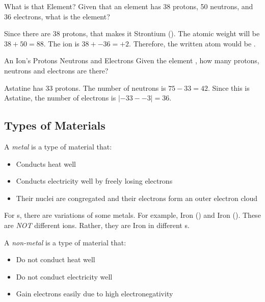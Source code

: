 \begin{example}[]{What is that Element?}
  Given that an element has 38 protons, 50 neutrons, and 36 electrons, what is the element?
  
  \tcblower
  
  Since there are 38 protons, that makes it Strontium ().
  The atomic weight will be $38 + 50 = 88$.
  The ion is $38 + -36 = +2$.
  Therefore, the written atom would be .
\end{example}

\begin{example}[]{An Ion's Protons Neutrons and Electrons}
  Given the element , how many protons, neutrons and electrons are there?
  
  \tcblower
  
  Astatine has 33 protons.
  The number of neutrons is $75 - 33 = 42$.
  Since this is Astatine, the number of electrons is $\lvert -33 - -3 \rvert = 36$.
\end{example}

\subsection{Types of Materials} \label{subsec:Types of Materials}
\begin{definition}[Metal] \label{def:Metal}
  A \emph{metal} is a type of material that:
  \begin{itemize}[noitemsep, nolistsep]
    \item Conducts heat well
    \item Conducts electricity well by freely losing electrons
    \item Their nuclei are congregated and their electrons form an outer electron cloud
  \end{itemize}
  \begin{remark}
    For s, there are variations of some metals.
    For example, Iron () and Iron ().
    These are \emph{NOT} different ions.
    Rather, they are Iron in different s.
  \end{remark}
\end{definition}

\begin{definition} \label{def:Non-Metal}
  A \emph{non-metal} is a type of material that:
  \begin{itemize}[noitemsep, nolistsep]
    \item Do not conduct heat well
    \item Do not conduct electricity well
    \item Gain electrons easily due to high electronegativity
  \end{itemize}
\end{definition}

